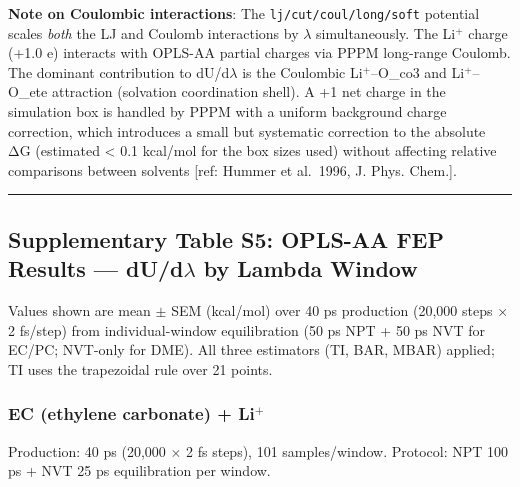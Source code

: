 \documentclass[
  11pt,
]{article}
\begin{document}
\textbf{Note on Coulombic interactions}: The
\texttt{lj/cut/coul/long/soft} potential scales \emph{both} the LJ and
Coulomb interactions by \(\lambda\) simultaneously. The Li\(^{+}\)
charge (+1.0 e) interacts with OPLS-AA partial charges via PPPM
long-range Coulomb. The dominant contribution to dU/d\(\lambda\) is the
Coulombic Li\(^{+}\)--O\_co3 and Li\(^{+}\)--O\_ete attraction
(solvation coordination shell). A +1 net charge in the simulation box is
handled by PPPM with a uniform background charge correction, which
introduces a small but systematic correction to the absolute ΔG
(estimated \textless{} 0.1 kcal/mol for the box sizes used) without
affecting relative comparisons between solvents {[}ref: Hummer et
al.~1996, J. Phys. Chem.{]}.

\begin{center}\rule{0.5\linewidth}{0.5pt}\end{center}

\subsection{\texorpdfstring{Supplementary Table S5: OPLS-AA FEP Results
--- dU/d\(\lambda\) by Lambda
Window}{Supplementary Table S5: OPLS-AA FEP Results --- dU/d\textbackslash lambda by Lambda Window}}\label{supplementary-table-s5-opls-aa-fep-results-dudlambda-by-lambda-window}

Values shown are mean \(\pm\) SEM (kcal/mol) over 40 ps production
(20,000 steps \(\times\) 2 fs/step) from individual-window equilibration
(50 ps NPT + 50 ps NVT for EC/PC; NVT-only for DME). All three
estimators (TI, BAR, MBAR) applied; TI uses the trapezoidal rule over 21
points.

\subsubsection{\texorpdfstring{EC (ethylene carbonate) +
Li\(^{+}\)}{EC (ethylene carbonate) + Li\^{}\{+\}}}\label{ec-ethylene-carbonate-li}

Production: 40 ps (20,000 \(\times\) 2 fs steps), 101 samples/window.
Protocol: NPT 100 ps + NVT 25 ps equilibration per window.
\end{document}
